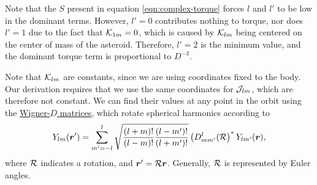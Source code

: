 \documentclass[aps,twocolumn,secnumarabic,balancelastpage,amsmath,amssymb,nofootinbib,floatfix]{revtex4-1}
\begin{document}
Note that the $S$ present in equation \ref{eqn:complex-torque} forces $l$ and $l'$ to be low in the dominant terms. However, $l'=0$ contributes nothing to torque, nor does $l'=1$ due to the fact that $\mathcal{K}_{1m}=0$, which is caused by $\mathcal{K}_{lm}$ being centered on the center of mass of the asteroid. Therefore, $l'=2$ is the minimum value, and the dominant torque term is proportional to $D^{-3}$.

Note that $\mathcal{K}_{lm}$ are constants, since we are using coordinates fixed to the body. Our derivation requires that we use the same coordinates for $\mathcal{J}_{lm}$, which are therefore not constant. We can find their values at any point in the orbit using the \href{https://en.wikipedia.org/wiki/Wigner_D-matrix#Relation_to_spherical_harmonics_and_Legendre_polynomials}{Wigner-$D$ matrices}, which rotate spherical harmonics according to
$$Y_{lm}(\bm r') = \sum_{m'=-l}^l\sqrt{\frac{(l+m)!}{(l-m)!}\frac{(l-m')!}{(l+m')!}}\left( D^l_{mm'}(\mathcal{R} \right)^*Y_{lm'}(\bm r),$$
where $\mathcal{R}$ indicates a rotation, and $\bm r' = \mathcal{R} \bm r$. Generally, $\mathcal{R}$ is represented by Euler angles.
\end{document}
